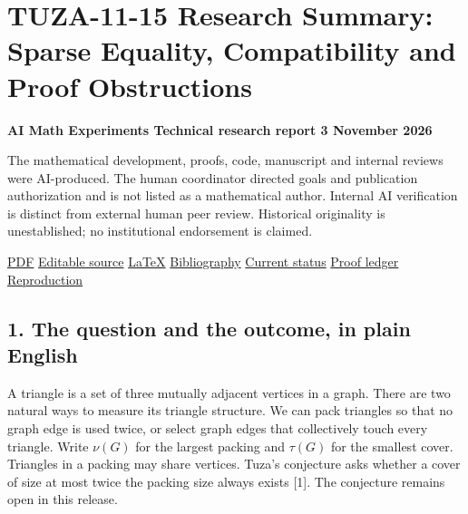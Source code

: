 \documentclass[11pt,a4paper]{article}
\begin{document}
\section{TUZA-11-15 Research Summary: Sparse Equality, Compatibility and Proof Obstructions}\label{tuza-11-15-research-summary-sparse-equality-compatibility-and-proof-obstructions}

\textbf{AI Math Experiments \textbar{} Technical research report \textbar{} 3 November 2026}

The mathematical development, proofs, code, manuscript and internal reviews were AI-produced. The human coordinator directed goals and publication authorization and is not listed as a mathematical author. Internal AI verification is distinct from external human peer review. Historical originality is unestablished; no institutional endorsement is claimed.

\href{https://github.com/pappa211/ai-math-experiments/blob/main/papers/tuza-11-15-research-summary/main.pdf}{PDF} \textbar{} \href{https://github.com/pappa211/ai-math-experiments/blob/main/papers/tuza-11-15-research-summary/manuscript.md}{Editable source} \textbar{} \href{https://github.com/pappa211/ai-math-experiments/blob/main/papers/tuza-11-15-research-summary/main.tex}{LaTeX} \textbar{} \href{https://github.com/pappa211/ai-math-experiments/blob/main/papers/tuza-11-15-research-summary/references.bib}{Bibliography} \textbar{} \href{https://github.com/pappa211/ai-math-experiments/blob/main/RESEARCH_STATUS_2026-11-03.md}{Current status} \textbar{} \href{https://github.com/pappa211/ai-math-experiments/blob/main/ORDINARY_PROOF_INDEX.md}{Proof ledger} \textbar{} \href{https://github.com/pappa211/ai-math-experiments/blob/main/REPRODUCTION.md#tuza-1115-ordinary-proofs-and-exact-finite-checks}{Reproduction}

\subsection{1. The question and the outcome, in plain English}\label{the-question-and-the-outcome-in-plain-english}

A triangle is a set of three mutually adjacent vertices in a graph. There are two natural ways to measure its triangle structure. We can pack triangles so that no graph edge is used twice, or select graph edges that collectively touch every triangle. Write \(\nu(G)\) for the largest packing and \(\tau(G)\) for the smallest cover. Triangles in a packing may share vertices. Tuza's conjecture asks whether a cover of size at most twice the packing size always exists {[}1{]}. The conjecture remains open in this release.
\end{document}
